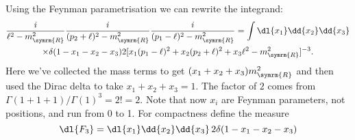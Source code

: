 \documentclass[fleqn]{NotesClass}
\newcommand{\renormalised}{\symrm{R}}
\begin{document}
    Using the Feynman parametrisation we can rewrite the integrand:
    \begin{gather}
        \frac{i}{\ell^2 - m_{\renormalised}^2} \frac{i}{(p_2 + \ell)^2 - m_{\renormalised}^2} \frac{i}{(p_1 - \ell)^2 - m_{\renormalised}^2} = \int \dl{x_1} \dd{x_2}\dd{x_3} \\
        \times \delta(1 - x_1 - x_2 - x_3) 2[x_1(p_1 - \ell)^2 + x_2(p_2 + \ell)^2 + x_3 \ell^2 - m_{\renormalised}^2]^{-3}. \notag
    \end{gather}
    Here we've collected the mass terms to get \((x_1 + x_2 + x_3)m_{\renormalised}^2\) and then used the Dirac delta to take \(x_1 + x_2 + x_3 = 1\).
    The factor of \(2\) comes from \(\Gamma(1 + 1 + 1)/\Gamma(1)^3 = 2! = 2\).
    Note that now \(x_i\) are Feynman parameters, not positions, and run from 0 to 1.
    For compactness define the measure
    \begin{equation}
        \dl{F_3} = \dl{x_1} \dd{x_2} \dd{x_3} \, 2\delta(1 - x_1 - x_2 - x_3)
    \end{equation}
    
\end{document}
